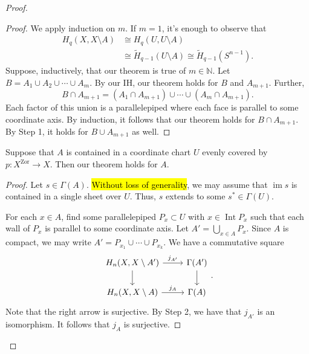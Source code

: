 \documentclass[10pt,letterpaper,cm]{nupset}
\theoremstyle{definition}
\theoremstyle{theorem}
\theoremstyle{remark}
\newcommand{\N}{\mathbb N}
\newcommand{\1}{\mathbb{1}}
\newcommand{\0}{\vec 0}
\DeclareMathOperator{\im}{im}
\DeclareMathOperator{\Int}{Int}
\begin{document}
\begin{proof}
\begin{steps}
\begin{proof}
We apply induction on $m$. If $m=1$, it's enough to observe that
\begin{align*}
H_q(X, X\setminus A) & \cong H_q(U, U\setminus A)
\\ &\cong  \widetilde{H}_{q-1}(U\setminus A) \cong \widetilde{H}_{q-1}(S^{n-1}).
\end{align*} Suppose, inductively, that our theorem is true of $m\in \N$. Let $B= A_1 \cup A_2 \cup \cdots \cup  A_m$. By our IH, our theorem holds for $B$ and $A_{m+1}$. Further, $$B \cap A_{m+1} = \left(A_1 \cap A_{m+1}\right) \cup \cdots \cup \left(A_m \cap A_{m+1}\right) .$$ Each factor of this union is a parallelepiped where each face is parallel to some coordinate axis. By induction, it follows that our theorem holds for $B \cap A_{m+1}$. By Step 1, it holds for $B \cup A_{m+1}$ as well.
\end{proof}
\item Suppose that $A$ is contained in a coordinate chart $U$ evenly covered by $p: X^{\mathrm{Zor}} \to X$. Then our theorem holds for $A$.
\begin{proof}
Let $s\in \Gamma(A)$. \hl{Without loss of generality}, we may assume that $\im{s}$ is contained in a single sheet over $U$. Thus, $s$ extends to some $s^{\ast} \in \Gamma(U)$.

For each $x\in A$, find some parallelepiped $P_x \subset U$ with $x\in \Int{P_x}$ such that each wall of $P_x$ is parallel to some coordinate axis. Let $A' = \bigcup_{x\in A}P_x$. Since $A$ is compact, we may write $A' = P_{x_1} \cup \cdots \cup P_{x_k}$. We have a commutative square
\[
\begin{tikzcd}
{H_n(X, X\setminus A')} \arrow[r, "j_{A'}"] \arrow[d] & \Gamma(A') \arrow[d] \\
{H_n(X, X\setminus A)} \arrow[r, "j_A"]               & \Gamma(A)           
\end{tikzcd}
.\] Note that the right arrow is surjective. By Step 2, we have that $j_{A'}$ is an isomorphism. It follows that $j_A$ is surjective.


\end{proof}
\end{steps}
\end{proof}
\end{document}

